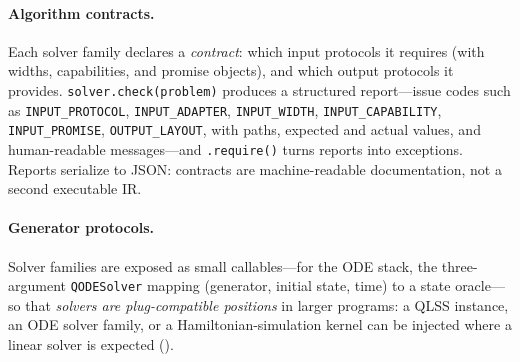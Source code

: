 \paragraph{Algorithm contracts.}
Each solver family declares a \emph{contract}: which input protocols it
requires (with widths, capabilities, and promise objects), and which output
protocols it provides.  \texttt{solver.check(problem)} produces a structured
report---issue codes such as \texttt{INPUT\_PROTOCOL},
\texttt{INPUT\_ADAPTER}, \texttt{INPUT\_WIDTH}, \texttt{INPUT\_CAPABILITY},
\texttt{INPUT\_PROMISE}, \texttt{OUTPUT\_LAYOUT}, with paths, expected and
actual values, and human-readable messages---and \texttt{.require()} turns
reports into exceptions.  Reports serialize to JSON: contracts are
machine-readable documentation, not a second executable IR.

\paragraph{Generator protocols.}
Solver families are exposed as small callables---for the ODE stack, the
three-argument \texttt{QODESolver} mapping (generator, initial state,
time) to a state oracle---so that \emph{solvers are plug-compatible
positions} in larger programs: a QLSS instance, an ODE solver family, or a
Hamiltonian-simulation kernel can be injected where a linear solver is
expected ().


